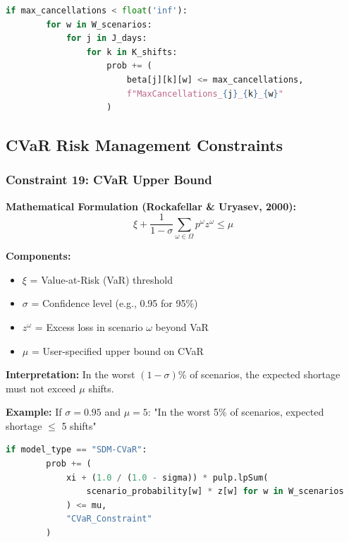 \documentclass[12pt,a4paper]{article}
\begin{document}
\begin{lstlisting}[language=Python, caption=Constraint 18 Implementation (model.py:L1101)]
    if max_cancellations < float('inf'):
        for w in W_scenarios:
            for j in J_days:
                for k in K_shifts:
                    prob += (
                        beta[j][k][w] <= max_cancellations,
                        f"MaxCancellations_{j}_{k}_{w}"
                    )
\end{lstlisting}

\newpage

\subsection{CVaR Risk Management Constraints}

\subsubsection{Constraint 19: CVaR Upper Bound}

\begin{tcolorbox}[title=Constraint 19: CVaR Risk Control]
\textbf{Mathematical Formulation (Rockafellar \& Uryasev, 2000):}
\begin{equation}
\xi + \frac{1}{1-\sigma} \sum_{\omega \in \Omega} p^\omega z^\omega \leq \mu
\end{equation}

\textbf{Components:}
\begin{itemize}
    \item $\xi$ = Value-at-Risk (VaR) threshold
    \item $\sigma$ = Confidence level (e.g., 0.95 for 95\%)
    \item $z^\omega$ = Excess loss in scenario $\omega$ beyond VaR
    \item $\mu$ = User-specified upper bound on CVaR
\end{itemize}

\textbf{Interpretation:} In the worst $(1-\sigma)\%$ of scenarios, the expected shortage must not exceed $\mu$ shifts.

\textbf{Example:} If $\sigma=0.95$ and $\mu=5$: "In the worst 5\% of scenarios, expected shortage $\leq$ 5 shifts"
\end{tcolorbox}

\begin{lstlisting}[language=Python, caption=Constraint 19 Implementation (model.py:L1150)]
    if model_type == "SDM-CVaR":
        prob += (
            xi + (1.0 / (1.0 - sigma)) * pulp.lpSum(
                scenario_probability[w] * z[w] for w in W_scenarios
            ) <= mu,
            "CVaR_Constraint"
        )
\end{lstlisting}
\end{document}
